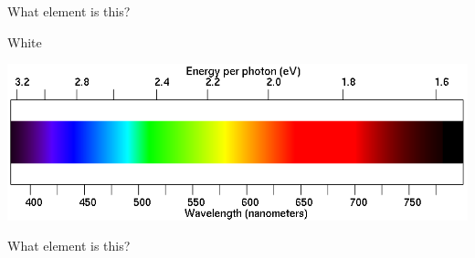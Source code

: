 \documentclass[12pt]{article}
\begin{document}
\begin{minipage}{0.5\textwidth}
What element is this?
\end{minipage}
\begin{minipage}{0.5\textwidth}
\end{minipage}


\begin{minipage}{0.1\textwidth}
\begin{center}
\large White
\end{center}
\end{minipage}
\begin{minipage}{0.8\textwidth}
\includegraphics[width=\textwidth]{spectrum2.png}
\end{minipage}

\begin{minipage}{0.5\textwidth}
What element is this?
\end{minipage}
\begin{minipage}{0.5\textwidth}
\end{minipage}

\newpage
\end{document}
